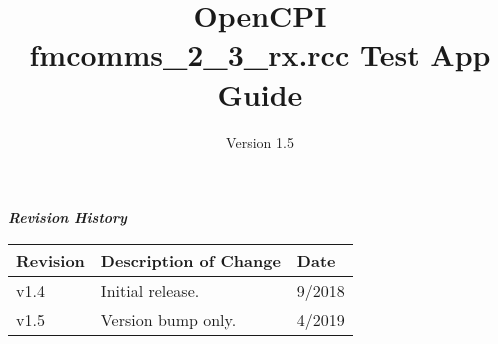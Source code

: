 \iffalse
This file is protected by Copyright. Please refer to the COPYRIGHT file
distributed with this source distribution.

This file is part of OpenCPI <http://www.opencpi.org>

OpenCPI is free software: you can redistribute it and/or modify it under the
terms of the GNU Lesser General Public License as published by the Free Software
Foundation, either version 3 of the License, or (at your option) any later
version.

OpenCPI is distributed in the hope that it will be useful, but WITHOUT ANY
WARRANTY; without even the implied warranty of MERCHANTABILITY or FITNESS FOR A
PARTICULAR PURPOSE. See the GNU Lesser General Public License for more details.

You should have received a copy of the GNU Lesser General Public License along
with this program. If not, see <http://www.gnu.org/licenses/>.
\fi

\def\docTitle{OpenCPI\\ fmcomms\_2\_3\_rx.rcc Test App Guide}
\def\docVersion{1.5}
\def\snippetpath{../../../../../doc/av/tex/snippets}


\date{Version \docVersion} %
\title{\docTitle}
\usepackage{graphicx}
\graphicspath{ {figures/} }
\usepackage{textcomp}
\usepackage{listings}


\maketitle

\begin{center}
  \textit{\textbf{Revision History}}
\end{center}
\begin{longtable}{|p{}
                  |p{}
                  |p{}|}
  \hline
  \rowcolor{blue}
  \textbf{Revision} & \textbf{Description of Change} & \textbf{Date} \\
  \hline
  v1.4 & Initial release. & 9/2018 \\
  \hline
  v1.5 & Version bump only. & 4/2019 \\
  \hline
\end{longtable}

